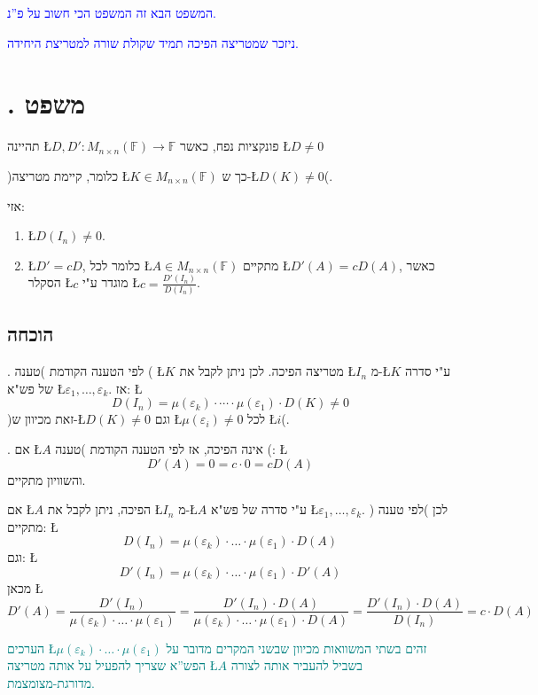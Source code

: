\documentclass[english,hebrew]{article}
\begin{document}
\textcolor{blue}{המשפט הבא זה המשפט הכי חשוב על פ\textquotedblright נ.}

\textcolor{blue}{ניזכר שמטריצה הפיכה תמיד שקולת שורה למטריצת היחידה.}

\section{{\endL}. משפט}

תהיינה \L{$D,D':M_{n\times n}(\mathbb{F})\to\mathbb{F}$} פונקציות
נפח, כאשר \L{$D\neq0$} 

)כלומר, קיימת מטריצה \L{$K\in M_{n\times n}(\mathbb{F})$} כך ש-\L{$D(K)\neq0$}(.

אזי:
\begin{enumerate}
\item \L{$D(I_{n})\neq0$}. 
\item \L{$D'=cD$}, כלומר לכל \L{$A\in M_{n\times n}(\mathbb{F})$} מתקיים
\L{$D'(A)=cD(A)$}, כאשר הסקלר \L{$c$} מוגדר ע"י \L{$c=\frac{D'(I_{n})}{D(I_{n})}$}. 
\end{enumerate}

\subsection{הוכחה}

{\endL}. לפי הטענה הקודמת )טענה {\endL}( \L{$K$}
מטריצה הפיכה. לכן ניתן לקבל את \L{$I_{n}$} מ-\L{$K$} ע"י סדרה של
פש"א \L{$\varepsilon_{1},\dots,\varepsilon_{k}$}. אז: \L{%
\[
D(I_{n})=\mu(\varepsilon_{k})\cdot\cdots\cdot\mu(\varepsilon_{1})\cdot D(K)\neq0
\]
}%
)זאת מכיוון ש-\L{$D(K)\neq0$} וגם \L{$\mu(\varepsilon_{i})\neq0$}
לכל \L{$i$}(.

{\endL}. אם \L{$A$} אינה הפיכה, אז לפי הטענה הקודמת )טענה
{\endL}(: \L{%
\[
D'(A)=0=c\cdot0=cD(A)
\]
}%
והשוויון מתקיים.

אם \L{$A$} הפיכה, ניתן לקבל את \L{$I_{n}$} מ-\L{$A$} ע"י סדרה
של פש"א \L{$\varepsilon_{1},\dots,\varepsilon_{k}$}. לכן )לפי טענה
{\endL}( מתקיים: \L{%
\[
D(I_{n})=\mu(\varepsilon_{k})\cdot\dots\cdot\mu(\varepsilon_{1})\cdot D(A)
\]
}%
וגם: \L{%
\[
D'(I_{n})=\mu(\varepsilon_{k})\cdot\dots\cdot\mu(\varepsilon_{1})\cdot D'(A)
\]
}%
מכאן \L{%
\[
D'(A)=\frac{D'(I_{n})}{\mu(\varepsilon_{k})\cdot\dots\cdot\mu(\varepsilon_{1})}=\frac{D'(I_{n})\cdot D(A)}{\mu(\varepsilon_{k})\cdot\dots\cdot\mu(\varepsilon_{1})\cdot D(A)}=\frac{D'(I_{n})\cdot D(A)}{D(I_{n})}=c\cdot D(A)
\]
}%
\medskip{}

\textcolor{teal}{הערכים \L{$\mu(\varepsilon_{k})\cdot\dots\cdot\mu(\varepsilon_{1})$}
זהים בשתי המשוואות מכיוון שבשני המקרים מדובר על הפש\textquotedblright א
שצריך להפעיל על אותה מטריצה \L{$A$} בשביל להעביר אותה לצורה מדורגת-מצומצמת.}
\end{document}

